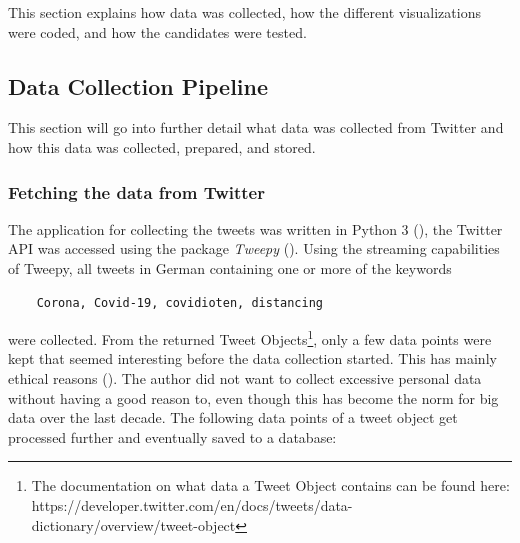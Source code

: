 This section explains how data was collected, how the different visualizations were coded, and how the candidates were tested.

\subsection{Data Collection Pipeline}
This section will go into further detail what data was collected from Twitter and how this data was collected, prepared, and stored.

\subsubsection{Fetching the data from Twitter}

The application for collecting the tweets was written in Python 3 (\cite{10.5555/1593511}), the Twitter API was accessed using the package \emph{Tweepy} (\cite{roesslein2020tweepy}). Using the streaming capabilities of Tweepy, all tweets in German containing one or more of the keywords \begin{verbatim}
    Corona, Covid-19, covidioten, distancing
\end{verbatim}
were collected. From the returned Tweet Objects\footnote{The documentation on what data a Tweet Object contains can be found here: https://developer.twitter.com/en/docs/tweets/data-dictionary/overview/tweet-object}, only a few data points were kept that seemed interesting before the data collection started. This has mainly ethical reasons (\cite{richards2014big}). The author did not want to collect excessive personal data without having a good reason to, even though this has become the norm for big data over the last decade. The following data points of a tweet object get processed further and eventually saved to a database:

